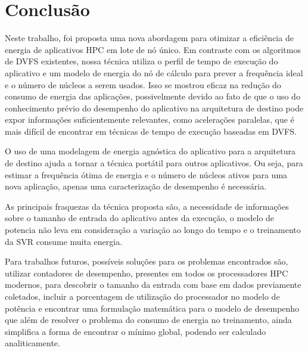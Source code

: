 \chapter{Conclusão}

Neste trabalho, foi proposta uma nova abordagem para otimizar a eficiência de energia de aplicativos HPC em lote de nó único. Em contraste com os algoritmos de DVFS existentes, nossa técnica utiliza o perfil de tempo de execução do aplicativo e um modelo de energia do nó de cálculo para prever a frequência ideal e o número de núcleos a serem usados. Isso se mostrou eficaz na redução do consumo de energia das aplicações, possivelmente devido ao fato de que o uso do conhecimento prévio do desempenho do aplicativo na arquitetura de destino pode expor informações suficientemente relevantes, como acelerações paralelas, que é mais difícil de encontrar em técnicas de tempo de execução baseadas em DVFS.

O uso de uma modelagem de energia agnóstica do aplicativo para a arquitetura de destino ajuda a tornar a técnica portátil para outros aplicativos. Ou seja, para estimar a frequência ótima de energia e o número de núcleos ativos para uma nova aplicação, apenas uma caracterização de desempenho é necessária.

As principais fraquezas da técnica proposta são, a necessidade de informações sobre o tamanho de entrada do aplicativo antes da execução, o modelo de potencia não leva em consideração a variação ao longo do tempo e o treinamento da SVR consume muita energia.

Para trabalhos futuros, possíveis soluções para os problemas encontrados são, utilizar contadores de desempenho, presentes em todos os processadores HPC modernos, para descobrir o tamanho da entrada com base em dados previamente coletados, incluir a porcentagem de utilização do processador no modelo de potência e encontrar uma formulação matemática para o modelo de desempenho que além de resolver o problema do consumo de energia no treinamento, ainda simplifica a forma de encontrar o mínimo global, podendo ser calculado analiticamente.